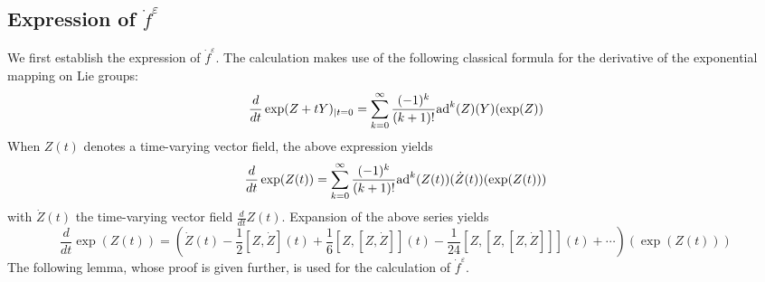 \documentclass[a4paper,twoside]{article}
\def \ad {\textnormal{ad}}
\def \eps {\varepsilon}
\begin{document}
\subsection*{Expression of $\dot f^\eps$}
We first establish the expression of $\dot f^\eps$.
The calculation makes use of the following classical formula \cite[Pg. 105]{he78} for the derivative
of the exponential mapping on Lie groups:
\begin{equation}
\label{dexp}
\frac{d}{dt} \exp(Z+tY)_{|t=0} = \sum_{k=0}^{\infty} \frac{(-1)^k}{(k+1)!} \ad^k (Z)(Y)(\exp (Z))
\end{equation}
When $Z(t)$ denotes a time-varying vector field, the above expression yields
\[
\frac{d}{dt} \exp(Z(t)) = \sum_{k=0}^{\infty} \frac{(-1)^k}{(k+1)!} \ad^k(Z(t))(\dot Z(t))(\exp (Z(t)))
\]
with $\dot Z(t)$ the time-varying vector field $\frac{d}{dt} Z(t)$. Expansion of the above series yields 
\begin{equation}
\label{expand}
 \frac{d}{dt} \exp(Z(t)) =
\left( \dot Z(t) -\frac{1}{2} [Z,\dot Z](t) +\frac{1}{6}[Z,[Z,\dot Z]](t)  -\frac{1}{24} [Z,[Z,[Z,\dot Z]]](t)  + \cdots \right) (\exp(Z(t)))
\end{equation}
The following lemma, whose proof is given further, is used for the calculation of $\dot f^\eps$.
\end{document}
